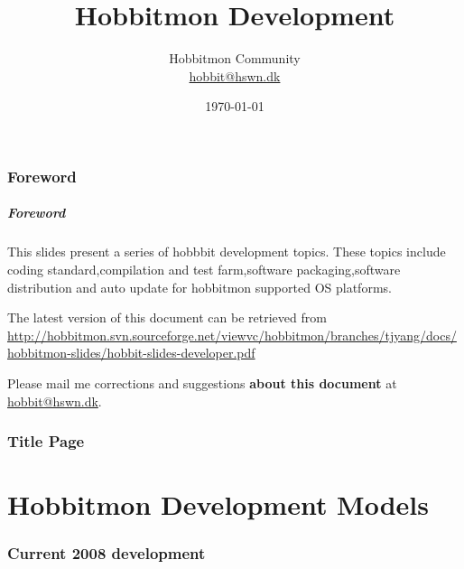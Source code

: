 \documentclass{beamer}
\title{Hobbitmon Development}
\author[T.J. Yang]{Hobbitmon Community \\\url{hobbit@hswn.dk}}
\date{\today}
\newcommand{\mypart}[1]{\part{#1}\frame{\partpage \tableofcontents}}
\begin{document}
\section*{Foreword}
\begin{frame}
\frametitle{Foreword }

This slides present a series of hobbbit development topics. These topics include coding standard,compilation and test farm,software packaging,software distribution and auto update for hobbitmon supported OS platforms.



\bigskip

The latest version of this document can be retrieved from\\
{\small \url{http://hobbitmon.svn.sourceforge.net/viewvc/hobbitmon/branches/tjyang/docs/hobbitmon-slides/hobbit-slides-developer.pdf}}

\bigskip

Please mail me corrections and suggestions \textbf{about this
  document} at \url{hobbit@hswn.dk}.

\end{frame}



\section*{Title Page}

\begin{frame}
  \titlepage

\centering
{}

\end{frame}


\mypart{Hobbitmon Development Models}

\section{Current 2008 development}
\end{document}
